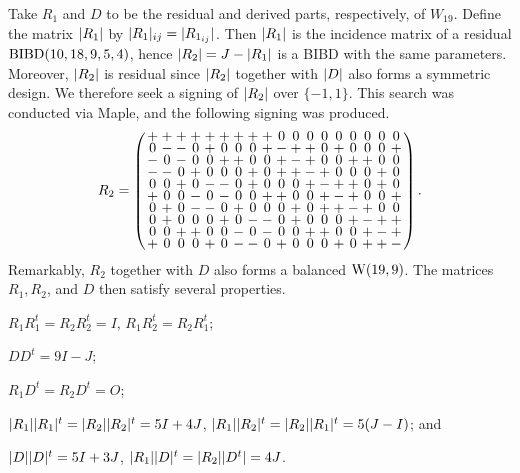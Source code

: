 \documentclass[../../../main]{subfiles}
\begin{document}
 Take $R_1$ and $D$ to be the residual and derived parts, respectively, of $W_{19}$. Define the matrix $|R_1|$ by $|R_1|_{ij}=|R_{1_{ij}}|$. Then $|R_1|$ is the incidence matrix of a residual $\text{BIBD}(10,18,9,5,4)$, hence $|R_2|=J-|R_1|$ is a BIBD with the same parameters. Moreover, $|R_2|$ is residual since $|R_2|$ together with $|D|$ also forms a symmetric design. We therefore seek a signing of $|R_2|$ over $\{-1,1\}$. This search was conducted via Maple, and the following signing was produced.
 \[
  R_2=
  \arraycolsep=1.25pt\def\arraystretch{0.625}
  \left(\begin{array}{cccccccccccccccccc}
+&+&+&+&+&+&+&+&+&0&0&0&0&0&0&0&0&0\\
0&-&-&0&+&0&0&0&+&-&+&+&0&+&0&0&0&+\\
-&0&-&0&0&+&+&0&0&+&-&+&0&0&+&+&0&0\\
-&-&0&+&0&0&0&+&0&+&+&-&+&0&0&0&+&0\\
0&0&+&0&-&-&0&+&0&0&0&+&-&+&+&0&+&0\\
+&0&0&-&0&-&0&0&+&+&0&0&+&-&+&0&0&+\\
0&+&0&-&-&0&+&0&0&0&+&0&+&+&-&+&0&0\\
0&+&0&0&0&+&0&-&-&0&+&0&0&0&+&-&+&+\\
0&0&+&+&0&0&-&0&-&0&0&+&+&0&0&+&-&+\\
+&0&0&0&+&0&-&-&0&+&0&0&0&+&0&+&+&-\\
  \end{array}\right).
 \]
 Remarkably, $R_2$ together with $D$ also forms a balanced $\text{W}(19,9)$. The matrices $R_1,R_2$, and $D$ then satisfy several properties.
 
 \begin{lem}\label{base-bw-lem}
  \begin{defenum}
   \item[]
   \item\label{base-bw-lem-1} $R_1R_1^t=R_2R_2^t=I$, $R_1R_2^t=R_2R_1^t$;
   \item\label{base-bw-lem-2} $DD^t=9I-J$;
   \item\label{base-bw-lem-3} $R_1D^t=R_2D^t=O$;
   \item\label{base-bw-lem-4} $|R_1||R_1|^t=|R_2||R_2|^t=5I+4J$, $|R_1||R_2|^t=|R_2||R_1|^t=5(J-I)$; and
   \item\label{base-bw-lem-5} $|D||D|^t=5I+3J$, $|R_1||D|^t=|R_2||D^t|=4J$.
  \end{defenum}
 \end{lem}
 
\end{document}
